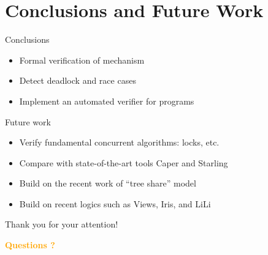\documentclass[11pt]{beamer}
\newcommand\orange[1]{\textcolor{orange}{\textbf{#1}}}
\begin{document}
\section{Conclusions and Future Work}
\begin{frame}{Conclusions}
  \begin{itemize}
  \item Formal verification of {\CDL} mechanism
  \item Detect deadlock and race cases
  \item Implement an automated verifier for {\CDL} programs
  \end{itemize}
\end{frame}

\begin{frame}{Future work}
  \begin{itemize}
  \item Verify fundamental concurrent algorithms: locks, etc.
  \item Compare with state-of-the-art tools Caper and Starling
    \item Build on the recent work of ``tree share'' model
  \item Build on recent logics such as Views, Iris, and LiLi
  \end{itemize}
\end{frame}

\begin{frame}{Thank you for your attention!}
  \begin{center}
    \Large \orange{Questions ?}
  \end{center}
\end{frame}
\end{document}
